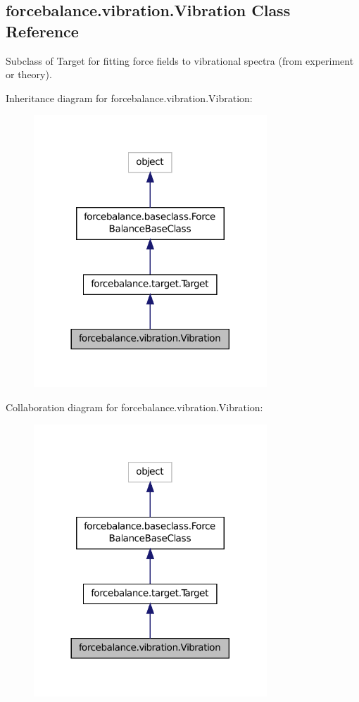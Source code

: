\hypertarget{classforcebalance_1_1vibration_1_1Vibration}{\subsection{forcebalance.\-vibration.\-Vibration Class Reference}
\label{classforcebalance_1_1vibration_1_1Vibration}
}


Subclass of Target for fitting force fields to vibrational spectra (from experiment or theory).  




Inheritance diagram for forcebalance.\-vibration.\-Vibration\-:
\nopagebreak
\begin{figure}[H]
\begin{center}
\leavevmode
\includegraphics[width=248pt]{classforcebalance_1_1vibration_1_1Vibration__inherit__graph}
\end{center}
\end{figure}


Collaboration diagram for forcebalance.\-vibration.\-Vibration\-:
\nopagebreak
\begin{figure}[H]
\begin{center}
\leavevmode
\includegraphics[width=248pt]{classforcebalance_1_1vibration_1_1Vibration__coll__graph}
\end{center}
\end{figure}
